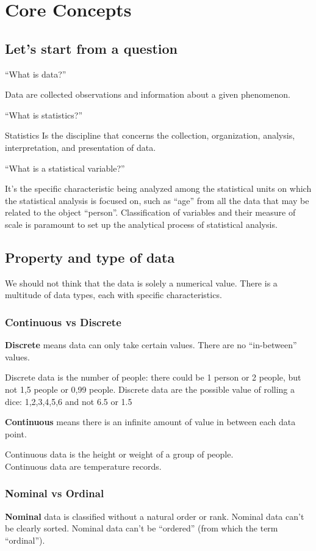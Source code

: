 \documentclass{article}
\begin{document}
\clearpage

\section{Core Concepts}
\subsection{Let's start from a question}
“What is data?”

Data are collected observations and information about a given phenomenon.

“What is statistics?”

Statistics Is the discipline that concerns the collection, organization, analysis, interpretation, and presentation of data.

“What is a statistical variable?”

It’s the specific characteristic being analyzed among the statistical units on which the statistical analysis is focused on, such as “age” from all the data that may be related to the object “person”. Classification of variables and their measure of scale is paramount to set up the analytical process of statistical analysis. 

\subsection{Property and type of data}

We should not think that the data is solely a numerical value. There is a multitude of data types, each with specific characteristics. 

\subsubsection{Continuous vs Discrete}
\textbf{Discrete} means data can only take certain values. There are no “in-between” values. 

Discrete data is the number of people: there could be 1 person or 2 people, but not 1,5 people or 0,99 people. 
Discrete data are the possible value of rolling a dice: 1,2,3,4,5,6 and not 6.5 or 1.5

\textbf{Continuous} means there is an infinite amount of value in between each data point.

Continuous data is the height or weight of a group of people. \\
Continuous data are temperature records. 
 
\subsubsection{Nominal vs Ordinal}
\textbf{Nominal} data is classified without a natural order or rank. Nominal data can’t be clearly sorted. 
Nominal data can’t be “ordered” (from which the term “ordinal”).
\end{document}
